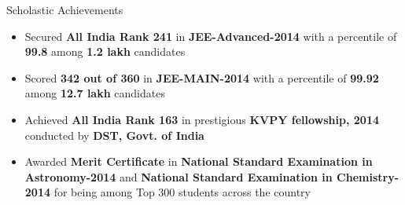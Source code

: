 \documentclass{resume}
\newcommand{\sepval}{-0.5em}
\begin{document}
\begin{rSection}{Scholastic Achievements}

\begin{itemize}[leftmargin=*]
	
	\itemsep \sepval

	\item Secured {\bf All India Rank 241} in {\bf JEE-Advanced-2014} with a percentile of {\bf 99.8} among {\bf 1.2 lakh} candidates
	
	\item Scored {\bf 342 out of 360} in {\bf JEE-MAIN-2014} with a percentile of {\bf 99.92} among {\bf 12.7 lakh} candidates

	\item  Achieved {\bf All India Rank 163} in prestigious {\bf KVPY fellowship, 2014} conducted by {\bf DST, Govt. of India}

	\item Awarded {\bf Merit Certificate} in {\bf National Standard Examination in Astronomy-2014} and 
	      {\bf National Standard Examination in Chemistry-2014} for being among Top 300 students across the country
	
\end{itemize}

\end{rSection}

\end{document}

